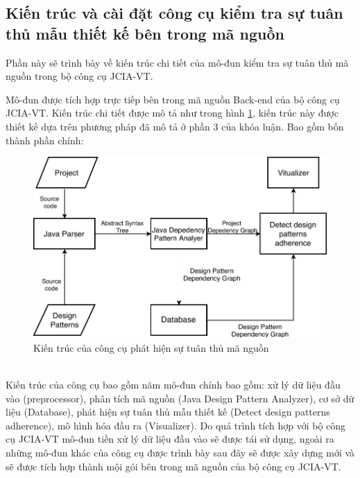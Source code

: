 \documentclass[12pt]{report}
\begin{document}
\subsection{Kiến trúc và cài đặt công cụ kiểm tra sự tuân thủ mẫu thiết kế bên trong mã nguồn}
Phần này sẽ trình bày về kiến trúc chi tiết của mô-đun kiểm tra sự tuân thủ mã nguồn trong bộ công cụ JCIA-VT.

\noindent Mô-đun được tích hợp trực tiếp bên trong mã nguồn Back-end của bộ công cụ JCIA-VT. Kiến trúc chi tiết được mô tả như trong hình \ref{fig:detect_design_pattern_architexture}, kiến trúc này được thiết kế dựa trên phương pháp đã mô tả ở phần 3 của khóa luận. Bao gồm bốn thành phần chính:
\begin{figure}[!htbp]
	\centering
	\includegraphics[scale=1.09]{images/c4_architexture.pdf}
	\caption{Kiến trúc của công cụ phát hiện sự tuân thủ mã nguồn}
	\label{fig:detect_design_pattern_architexture}
\end{figure}\\
Kiến trúc của công cụ bao gồm năm mô-đun chính bao gồm: xử lý dữ liệu đầu vào (preprocessor), phân tích mã nguồn (Java Design Pattern Analyzer), cơ sở dữ liệu (Database), phát hiện sự tuân thủ mẫu thiết kế (Detect design patterns adherence), mô hình hóa đầu ra (Visualizer). Do quá trình tích hợp với bộ công cụ JCIA-VT mô-đun tiền xử lý dữ liệu đầu vào sẽ được tái sử dụng, ngoài ra những mô-đun khác của công cụ được trình bày sau đây sẽ được xây dựng mới và sẽ được tích hợp thành mội gói bên trong mã nguồn của bộ công cụ  JCIA-VT.
\end{document}
